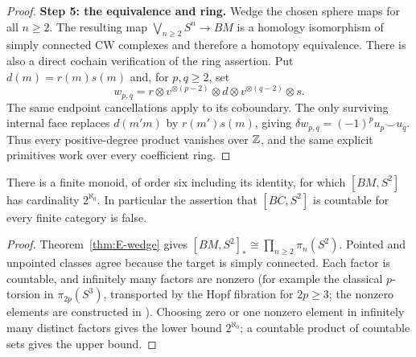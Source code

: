 \begin{proof}
\textbf{Step 5: the equivalence and ring.}
Wedge the chosen sphere maps for all $n\ge2$. The resulting map
$\bigvee_{n\ge2}S^n\to BM$ is a homology isomorphism of simply
connected CW complexes and therefore a homotopy equivalence.
There is also a direct cochain verification of the ring assertion.
Put $d(m)=r(m)s(m)$ and, for $p,q\ge2$, set
\[
 w_{p,q}=r\otimes v^{\otimes(p-2)}\otimes d
          \otimes v^{\otimes(q-2)}\otimes s.
\]
The same endpoint cancellations apply to its coboundary.
The only surviving internal face replaces $d(m'm)$ by
$r(m')s(m)$, giving
$\delta w_{p,q}=(-1)^p u_p\smile u_q$.
Thus every positive-degree product vanishes over $\mathbb Z$, and the
same explicit primitives work over every coefficient ring.
\end{proof}

\begin{corollary}\label{cor:E-uncountable}
There is a finite monoid, of order six including its identity, for which
$[BM,S^2]$ has cardinality $2^{\aleph_0}$. In particular the assertion
that $[BC,S^2]$ is countable for every finite category is false.
\end{corollary}
\begin{proof}
Theorem~\ref{thm:E-wedge} gives
$[BM,S^2]_*\cong\prod_{n\ge2}\pi_n(S^2)$.
Pointed and unpointed classes agree because the target is simply connected.
Each factor is countable, and infinitely many factors are nonzero
(for example the classical $p$-torsion in $\pi_{2p}(S^3)$,
transported by the Hopf fibration for $2p\ge3$; the nonzero elements
are constructed in \cite[Example 4L.6, p.~495]{hatcher2002}).
Choosing zero or one nonzero element in infinitely many distinct factors
gives the lower bound $2^{\aleph_0}$; a countable product of countable
sets gives the upper bound.
\end{proof}

